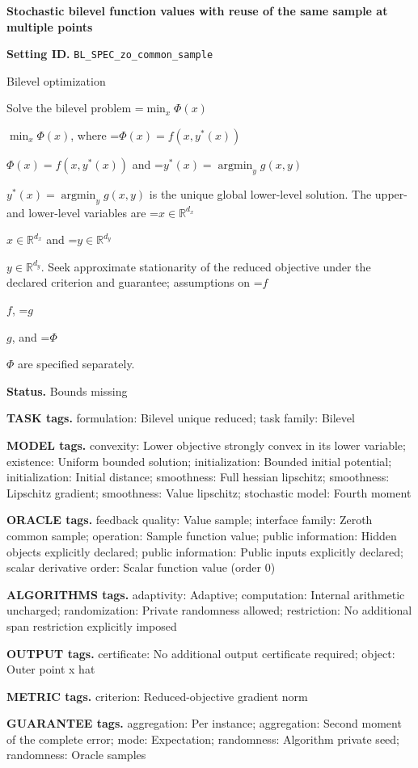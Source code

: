 \documentclass[10pt,a4paper]{article}
\newcommand{\AtlasMath}[1]{\par\begingroup\centering\setbox0=\hbox{$\displaystyle #1$}\ifdim\wd0>1.4\linewidth\typeout{ATLAS WIDE FORMULA: \the\wd0}\fi\ifdim\wd0>\linewidth\resizebox{\linewidth}{!}{\box0}\else\box0\fi\par\endgroup}
\newcommand{\AtlasInlineMath}[1]{\begingroup\setbox0=\hbox{$#1$}\ifdim\wd0>.4\linewidth\endgroup\AtlasMath{#1}\else\endgroup$#1$\fi}
\begin{document}
\raggedright

{\LARGE\bfseries\sffamily\color{AtlasNavy} Stochastic bilevel function values with reuse of the same sample at multiple points\par}\vspace{5pt}
\textbf{Setting ID.} \texttt{BL\_\allowbreak{}SPEC\_\allowbreak{}zo\_\allowbreak{}common\_\allowbreak{}sample}

Bilevel optimization

Solve the bilevel problem \AtlasInlineMath{\min_x\Phi(x)}, where \AtlasInlineMath{\Phi(x)=f(x,y^*(x))} and \AtlasInlineMath{y^*(x)=\operatorname*{argmin}_y g(x,y)} is the unique global lower-level solution. The upper- and lower-level variables are \AtlasInlineMath{x\in\mathbb{R}^{d_x}} and \AtlasInlineMath{y\in\mathbb{R}^{d_y}}. Seek approximate stationarity of the reduced objective under the declared criterion and guarantee; assumptions on \AtlasInlineMath{f}, \AtlasInlineMath{g}, and \AtlasInlineMath{\Phi} are specified separately.

\textbf{Status.} Bounds missing

\textbf{TASK tags.} formulation: Bilevel unique reduced; task family: Bilevel

\textbf{MODEL tags.} convexity: Lower objective strongly convex in its lower variable; existence: Uniform bounded solution; initialization: Bounded initial potential; initialization: Initial distance; smoothness: Full hessian lipschitz; smoothness: Lipschitz gradient; smoothness: Value lipschitz; stochastic model: Fourth moment

\textbf{ORACLE tags.} feedback quality: Value sample; interface family: Zeroth common sample; operation: Sample function value; public information: Hidden objects explicitly declared; public information: Public inputs explicitly declared; scalar derivative order: Scalar function value (order 0)

\textbf{ALGORITHMS tags.} adaptivity: Adaptive; computation: Internal arithmetic uncharged; randomization: Private randomness allowed; restriction: No additional span restriction explicitly imposed

\textbf{OUTPUT tags.} certificate: No additional output certificate required; object: Outer point x hat

\textbf{METRIC tags.} criterion: Reduced-objective gradient norm

\textbf{GUARANTEE tags.} aggregation: Per instance; aggregation: Second moment of the complete error; mode: Expectation; randomness: Algorithm private seed; randomness: Oracle samples
\end{document}

